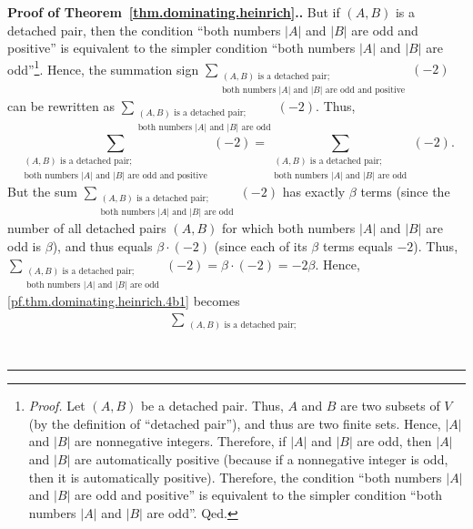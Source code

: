\documentclass[numbers=enddot,12pt,final,onecolumn,notitlepage]{scrartcl}%
\theoremstyle{definition}
\newenvironment{proof}[1][Proof]{\noindent\textbf{#1.} }{\ \rule{0.5em}{0.5em}}
\let\sumnonlimits\sum
\renewcommand{\sum}{\sumnonlimits\limits}
\newcommand{\abs}[1]{\left| #1 \right|}
\newcommand{\tup}[1]{\left( #1 \right)}
\begin{document}
\begin{proof}[Proof of Theorem~\ref{thm.dominating.heinrich}.]
But if $\tup{A, B}$ is a detached pair, then the condition
``both numbers $\abs{A}$ and $\abs{B}$ are odd and positive'' is
equivalent to the simpler condition
``both numbers $\abs{A}$ and $\abs{B}$ are
odd''\footnote{\textit{Proof.} Let $\tup{A, B}$ be a detached pair.
Thus, $A$ and $B$ are two subsets of $V$ (by the definition of
``detached pair''), and thus are two finite sets. Hence, $\abs{A}$ and
$\abs{B}$ are nonnegative integers. Therefore, if $\abs{A}$ and
$\abs{B}$ are odd, then $\abs{A}$ and $\abs{B}$ are automatically
positive (because if a nonnegative integer is odd, then it is
automatically positive). Therefore, the condition
``both numbers $\abs{A}$ and $\abs{B}$ are odd and positive'' is
equivalent to the simpler condition
``both numbers $\abs{A}$ and $\abs{B}$ are odd''. Qed.}. Hence, the
summation sign
$\sum_{\substack{\tup{A, B} \text{ is a detached pair}; \\
                \text{both numbers } \abs{A} \text{ and } \abs{B}
                \text{ are odd and positive}}} \tup{-2}$
can be rewritten as
$\sum_{\substack{\tup{A, B} \text{ is a detached pair}; \\
                \text{both numbers } \abs{A} \text{ and } \abs{B}
                \text{ are odd}}} \tup{-2}$.
Thus,
\[
\sum_{\substack{\tup{A, B} \text{ is a detached pair}; \\
                \text{both numbers } \abs{A} \text{ and } \abs{B}
                \text{ are odd and positive}}} \tup{-2}
= \sum_{\substack{\tup{A, B} \text{ is a detached pair}; \\
                \text{both numbers } \abs{A} \text{ and } \abs{B}
                \text{ are odd}}} \tup{-2} .
\]
But the sum $\sum_{\substack{\tup{A, B} \text{ is a detached pair}; \\
                \text{both numbers } \abs{A} \text{ and } \abs{B}
                \text{ are odd}}} \tup{-2}$
has exactly $\beta$ terms (since the number of all detached pairs
$\tup{A, B}$ for which both numbers $\abs{A}$ and $\abs{B}$ are odd
is $\beta$), and thus equals $\beta \cdot \tup{-2}$ (since
each of its $\beta$ terms equals $-2$). Thus, \newline
$\sum_{\substack{\tup{A, B} \text{ is a detached pair}; \\
                \text{both numbers } \abs{A} \text{ and } \abs{B}
                \text{ are odd}}} \tup{-2}
= \beta \cdot \tup{-2} = -2 \beta$. Hence,
\eqref{pf.thm.dominating.heinrich.4b1} becomes
\begin{align}
\sum_{\substack{\tup{A, B} \text{ is a detached pair}; \\
}}
\end{align}
\end{proof}
\end{document}
